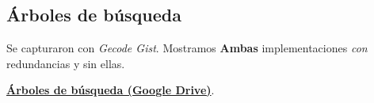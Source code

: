 
\subsection{Árboles de búsqueda}\label{sec:03-secuencia-magica-arboles}
Se capturaron con \textit{Gecode Gist}. Mostramos \textbf{Ambas} implementaciones \emph{con} redundancias y sin ellas.

\href{https://drive.google.com/drive/folders/1NPznGGeZ-hFLvmOYAyUOOMB1MFRi4tF5}{\textbf{Árboles de búsqueda (Google Drive)}}.
